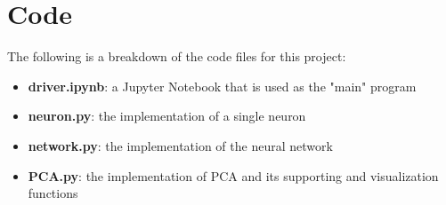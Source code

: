 \documentclass[12pt]{article}
\begin{document}
	\section{Code}
	The following is a breakdown of the code files for this project:
	\begin{itemize}
		\item \textbf{driver.ipynb}: a Jupyter Notebook that is used as the "main" program
		\item \textbf{neuron.py}: the implementation of a single neuron
		\item \textbf{network.py}: the implementation of the neural network
		\item \textbf{PCA.py}: the implementation of PCA and its supporting and visualization functions
	\end{itemize}
\end{document}
